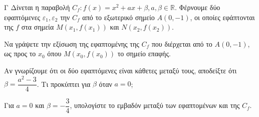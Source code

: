 \begin{thema}{Γ}
Δίνεται η παραβολή $C_f: f(x) = x^2 + a x + \beta, a, \beta \in \mathbb{R}$. Φέρνουμε δύο εφαπτόμενες $\varepsilon_1,\varepsilon_2$ την $C_f$ από το εξωτερικό σημείο $A(0, -1)$, οι οποίες εφάπτονται της $f$ στα σημεία $M(x_1, f(x_1))$ και $N(x_2, f(x_2))$.
\begin{erwthma}
  \item Να γράψετε την εξίσωση της εφαπτομένης της $C_f$ που διέρχεται από το $A(0,-1)$, ως προς το $x_0$ όπου $M(x_0,f(x_0))$ το σημείο επαφής.
  \item Αν γνωρίζουμε ότι οι δύο εφαπτόμενες είναι κάθετες μεταξύ τους, αποδείξτε ότι $\beta = \dfrac{a^2-3}{4}$. Τι προκύπτει για $\beta$ όταν $a=0$;
  \item Για $a = 0$ και $\beta = -\dfrac{3}{4}$, υπολογίστε το εμβαδόν μεταξύ των εφαπτομένων και της $C_f$.
\end{erwthma}
\end{thema}
